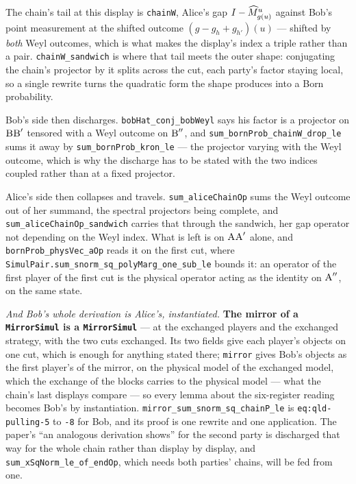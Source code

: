 The chain's tail at this display is \texttt{chainW}, Alice's gap $I - \widehat{M}^u_{g(u)}$
against Bob's point measurement at the shifted outcome $(g - g_h + g_{h'})(u)$ --- shifted by
\emph{both} Weyl outcomes, which is what makes the display's index a triple rather than a pair.
\texttt{chainW\_sandwich} is where that tail meets the outer shape: conjugating the chain's
projector by it splits across the cut, each party's factor staying local, so a single rewrite
turns the quadratic form the shape produces into a Born probability.

Bob's side then discharges. \texttt{bobHat\_conj\_bobWeyl} says his factor is a projector on
$\textsc{B} \textsc{B}'$ tensored with a Weyl outcome on $\textsc{B}''$, and
\texttt{sum\_bornProb\_chainW\_drop\_le} sums it away by \texttt{sum\_bornProb\_kron\_le}
--- the projector varying with the Weyl outcome, which is why the discharge has to be stated with
the two indices coupled rather than at a fixed projector.

Alice's side then collapses and travels. \texttt{sum\_aliceChainOp} sums the Weyl outcome out of
her summand, the spectral projectors being complete, and
\texttt{sum\_aliceChainOp\_sandwich} carries that through the sandwich, her gap operator not
depending on the Weyl index. What is left is on $\textsc{A} \textsc{A}'$ alone, and
\texttt{bornProb\_physVec\_aOp} reads it on the first cut, where
\texttt{SimulPair.sum\_snorm\_sq\_polyMarg\_one\_sub\_le} bounds it: an operator of the first
player of the first cut is the physical operator acting as the identity on $\textsc{A}''$, on the same
state.

\emph{And Bob's whole derivation is Alice's, instantiated.} \textbf{The mirror of a
\texttt{MirrorSimul} is a \texttt{MirrorSimul}} --- at the exchanged players and the exchanged
strategy, with the two cuts exchanged. Its two fields give each player's objects on one cut, which
is enough for anything stated there; \texttt{mirror} gives Bob's objects as the first player's of
the mirror, on the physical model of the exchanged model, which the exchange of the blocks carries
to the physical model --- what the chain's last displays compare --- so every lemma about the
six-register reading becomes Bob's by instantiation. \texttt{mirror\_sum\_snorm\_sq\_chainP\_le} is
\texttt{eq:qld-pulling-5} to \texttt{-8} for Bob, and its proof is one rewrite and one
application. The paper's ``an analogous derivation shows'' for the second party is discharged that
way for the whole chain rather than display by display, and
\texttt{sum\_xSqNorm\_le\_of\_endOp}, which needs both parties' chains, will be fed from one.

